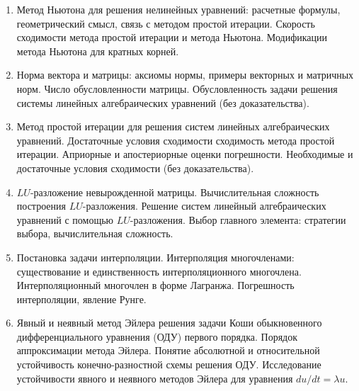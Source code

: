 % 
%

\begin{enumerate}
\item Метод Ньютона для решения нелинейных уравнений: расчетные формулы, геометрический смысл, связь  с методом простой итерации. Скорость сходимости метода простой итерации  и метода Ньютона. Модификации метода Ньютона для кратных корней.

\item Норма вектора и матрицы: аксиомы нормы, примеры векторных и матричных норм. Число обусловленности матрицы. Обусловленность задачи решения системы линейных алгебраических уравнений (без доказательства).

\item Метод простой итерации для решения систем линейных алгебраических уравнений. Достаточные условия сходимости сходимость метода простой итерации. Априорные и апостериорные оценки погрешности. Необходимые и достаточные условия сходимости (без доказательства).

\item $LU$-разложение невырожденной матрицы. Вычислительная сложность построения $LU$-разложения. Решение систем линейный алгебраических уравнений с помощью $LU$-разложения. Выбор главного элемента: стратегии выбора, вычислительная сложность.  

\item Постановка задачи интерполяции. Интерполяция многочленами: существование и единственность интерполяционного многочлена. Интерполяционный многочлен в форме Лагранжа. Погрешность интерполяции, явление Рунге.  

\item Явный и неявный метод Эйлера решения задачи Коши обыкновенного дифференциального уравнения (ОДУ) первого порядка. Порядок аппроксимации метода Эйлера. Понятие абсолютной и относительной устойчивость конечно-разностной схемы решения ОДУ. Исследование устойчивости явного и неявного методов Эйлера для уравнения $du/dt = \lambda u$.

\end{enumerate}
